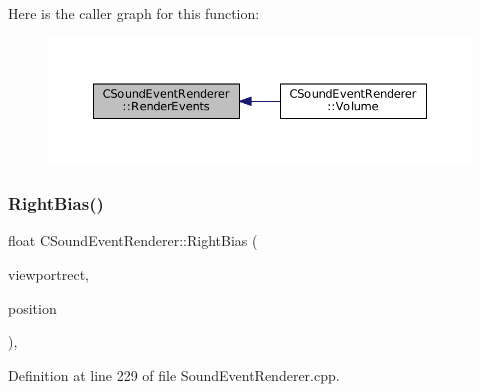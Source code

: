 Here is the caller graph for this function\+:\nopagebreak
\begin{figure}[H]
\begin{center}
\leavevmode
\includegraphics[width=350pt]{classCSoundEventRenderer_aa8b0c3029ea920ae4f4a08b9d9dd1c9c_icgraph}
\end{center}
\end{figure}
\hypertarget{classCSoundEventRenderer_a4be5ff09785c55c3b5b6966fb41eb47f}{}\label{classCSoundEventRenderer_a4be5ff09785c55c3b5b6966fb41eb47f} 
\subsubsection{\texorpdfstring{Right\+Bias()}{RightBias()}}
{\footnotesize\ttfamily float C\+Sound\+Event\+Renderer\+::\+Right\+Bias (\begin{DoxyParamCaption}\item[{const \hyperlink{structSRectangle}{S\+Rectangle} \&}]{viewportrect,  }\item[{const \hyperlink{classCPosition}{C\+Position} \&}]{position }\end{DoxyParamCaption})\hspace{0.3cm}{\ttfamily [static]}, {\ttfamily [protected]}}



Definition at line 229 of file Sound\+Event\+Renderer.\+cpp.


